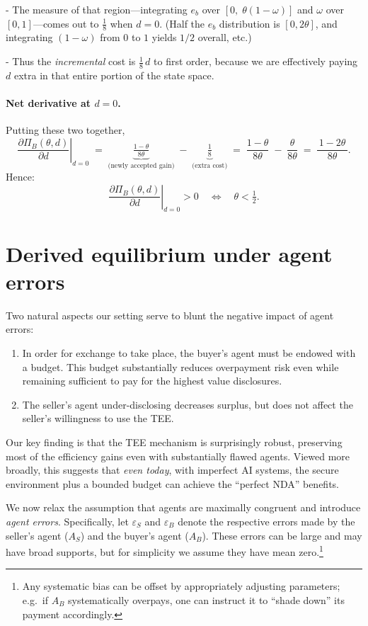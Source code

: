 \documentclass{article}
\begin{document}
- The measure of that region—integrating $e_b$ over $[0,\;\theta(1-\omega)]$ and $\omega$ over $[0,1]$—comes out to $\tfrac{1}{8}$ when $d=0$.  
  (Half the $e_b$ distribution is $[0,2\theta]$, and integrating $(1-\omega)$ from $0$ to $1$ yields $1/2$ overall, etc.)

- Thus the \emph{incremental} cost is $\tfrac{1}{8}\,d$ to first order, because we are effectively paying $d$ extra in that entire portion of the state space.

\paragraph{Net derivative at $d=0$.}
Putting these two together,
\[
  \left.\frac{\partial \Pi_B(\theta,d)}{\partial d}\right|_{d=0}
  \;=\;
  \underbrace{\tfrac{1-\theta}{8\theta}}_{\text{(newly accepted gain)}}
  \;-\;
  \underbrace{\tfrac{1}{8}}_{\text{(extra cost)}}
  \;=\;
  \frac{1-\theta}{8\theta} \;-\; \frac{\theta}{8\theta}
  \;=\;
  \frac{\,1 - 2\theta\,}{8\theta}.
\]
Hence:
\[
  \left.\frac{\partial \Pi_B(\theta,d)}{\partial d}\right|_{d=0} 
  > 0
  \quad\Longleftrightarrow\quad
  \theta < \tfrac{1}{2}.
\]

\section{Derived equilibrium under agent errors}
\label{app:agent-errors}
Two natural aspects our setting serve to blunt the negative impact of agent errors: 
\begin{enumerate}
    \item In order for exchange to take place, the buyer's agent must be endowed with a budget. This budget substantially reduces overpayment risk even while remaining sufficient to pay for the highest value disclosures.
     \item The seller's agent under-disclosing decreases surplus, but does not affect the seller's willingness to use the TEE.
\end{enumerate}

Our key finding is that the TEE mechanism is surprisingly robust, preserving most of the efficiency gains even with substantially flawed agents. Viewed more broadly, this suggests that \emph{even today}, with imperfect AI systems, the secure environment plus a bounded budget can achieve the “perfect NDA” benefits. 

We now relax the assumption that agents are maximally congruent and 
introduce \emph{agent errors}. Specifically, let 
$\varepsilon_S$ and $\varepsilon_B$ denote the respective errors made by 
the seller's agent ($A_S$) and the buyer's agent ($A_B$). These errors 
can be large and may have broad supports, but for simplicity we assume 
they have mean zero.\footnote{Any systematic bias can be offset by 
appropriately adjusting parameters; 
e.g.\ if $A_B$ systematically overpays, one can instruct it to ``shade down'' 
its payment accordingly.} 
\end{document}
